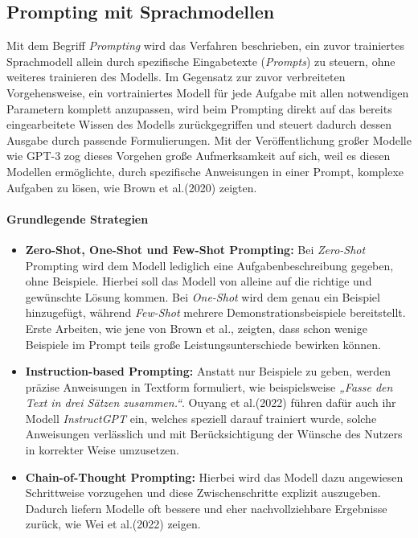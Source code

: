 \documentclass[11pt,a4paper]{article}
\begin{document}
\subsection{Prompting mit Sprachmodellen}
\label{sec:prompting}

Mit dem Begriff \emph{Prompting} wird das Verfahren beschrieben, ein zuvor trainiertes Sprachmodell allein durch spezifische Eingabetexte (\emph{Prompts}) zu steuern, ohne weiteres trainieren des Modells. Im Gegensatz zur zuvor verbreiteten Vorgehensweise, ein vortrainiertes Modell für jede Aufgabe mit allen notwendigen Parametern komplett anzupassen, wird beim Prompting direkt auf das bereits eingearbeitete Wissen des Modells zurückgegriffen und steuert dadurch dessen Ausgabe durch passende Formulierungen\cite{liu2021pretrainpromptpredictsystematic}. Mit der Veröffentlichung großer Modelle wie GPT-3 zog dieses Vorgehen große Aufmerksamkeit auf sich, weil es diesen Modellen ermöglichte, durch spezifische Anweisungen in einer Prompt, komplexe Aufgaben zu lösen, wie Brown et al.(2020)\cite{brown2020languagemodelsfewshotlearners} zeigten.

\paragraph{Grundlegende Strategien}
\begin{itemize}
  \item \textbf{Zero-Shot, One-Shot und Few-Shot Prompting:}  
  Bei \emph{Zero-Shot} Prompting wird dem Modell lediglich eine Aufgabenbeschreibung gegeben, ohne Beispiele. Hierbei soll das Modell von alleine auf die richtige und gewünschte Lösung kommen. Bei \emph{One-Shot} wird dem genau ein Beispiel hinzugefügt, während \emph{Few-Shot} mehrere Demonstrationsbeispiele bereitstellt. Erste Arbeiten, wie jene von Brown et al.\cite{brown2020languagemodelsfewshotlearners}, zeigten, dass schon wenige Beispiele im Prompt teils große Leistungsunterschiede bewirken können.

  \item \textbf{Instruction-based Prompting:}  
  Anstatt nur Beispiele zu geben, werden präzise Anweisungen in Textform formuliert, wie beispielsweise \emph{„Fasse den Text in drei Sätzen zusammen.“}. Ouyang et al.(2022) führen dafür auch ihr Modell \emph{InstructGPT} ein, welches speziell darauf trainiert wurde, solche Anweisungen verlässlich und mit Berücksichtigung der Wünsche des Nutzers in korrekter Weise umzusetzen\cite{ouyang2022traininglanguagemodelsfollow}.

  \item \textbf{Chain-of-Thought Prompting:}  
  Hierbei wird das Modell dazu angewiesen Schrittweise vorzugehen und diese Zwischenschritte explizit auszugeben. Dadurch liefern Modelle oft bessere und eher nachvollziehbare Ergebnisse zurück, wie Wei et al.(2022) zeigen\cite{wei2023chainofthoughtpromptingelicitsreasoning}.
\end{itemize}
\end{document}

